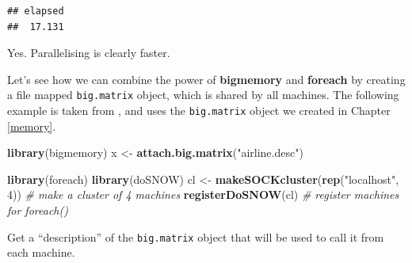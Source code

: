 \documentclass[]{book}
\newenvironment{Shaded}{\begin{snugshade}}{\end{snugshade}}
\newcommand{\KeywordTok}[1]{\textcolor[rgb]{0.13,0.29,0.53}{\textbf{#1}}}
\newcommand{\DataTypeTok}[1]{\textcolor[rgb]{0.13,0.29,0.53}{#1}}
\newcommand{\DecValTok}[1]{\textcolor[rgb]{0.00,0.00,0.81}{#1}}
\newcommand{\StringTok}[1]{\textcolor[rgb]{0.31,0.60,0.02}{#1}}
\newcommand{\CommentTok}[1]{\textcolor[rgb]{0.56,0.35,0.01}{\textit{#1}}}
\newcommand{\OtherTok}[1]{\textcolor[rgb]{0.56,0.35,0.01}{#1}}
\newcommand{\OperatorTok}[1]{\textcolor[rgb]{0.81,0.36,0.00}{\textbf{#1}}}
\newcommand{\NormalTok}[1]{#1}
\theoremstyle{definition}
\theoremstyle{definition}
\theoremstyle{definition}
\theoremstyle{remark}
\begin{document}
\begin{Shaded}
\end{Shaded}

\begin{verbatim}
## elapsed 
##  17.131
\end{verbatim}

Yes. Parallelising is clearly faster.

Let's see how we can combine the power of \textbf{bigmemory} and
\textbf{foreach} by creating a file mapped \texttt{big.matrix} object,
which is shared by all machines. The following example is taken from
\citet{kane2013scalable}, and uses the \texttt{big.matrix} object we
created in Chapter \ref{memory}.

\begin{Shaded}
\begin{Highlighting}[]
\KeywordTok{library}\NormalTok{(bigmemory)}
\NormalTok{x <-}\StringTok{ }\KeywordTok{attach.big.matrix}\NormalTok{(}\StringTok{"airline.desc"}\NormalTok{)}

\KeywordTok{library}\NormalTok{(foreach)}
\KeywordTok{library}\NormalTok{(doSNOW)}
\NormalTok{cl <-}\StringTok{ }\KeywordTok{makeSOCKcluster}\NormalTok{(}\KeywordTok{rep}\NormalTok{(}\StringTok{"localhost"}\NormalTok{, }\DecValTok{4}\NormalTok{)) }\CommentTok{# make a cluster of 4 machines}
\KeywordTok{registerDoSNOW}\NormalTok{(cl) }\CommentTok{# register machines for foreach()}
\end{Highlighting}
\end{Shaded}

Get a ``description'' of the \texttt{big.matrix} object that will be
used to call it from each machine.
\end{document}
